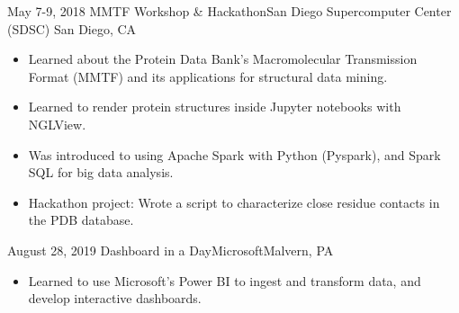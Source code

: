 \begin{experiences}
 \experience
    {May 7-9, 2018} {MMTF Workshop \& Hackathon}{San Diego Supercomputer Center (SDSC)}{ San Diego, CA}
    {}    {
        \begin{itemize}
        \item Learned about the Protein Data Bank's Macromolecular Transmission Format (MMTF) and its applications for structural data mining.
        \item Learned to render protein structures inside Jupyter notebooks with NGLView.
        \item Was introduced to using Apache Spark with Python (Pyspark), and Spark SQL for big data analysis.
        \item Hackathon project: Wrote a script to characterize close residue contacts in the PDB database.
        \end{itemize}
    }

\emptySeparator

\experience
    {August 28, 2019} {Dashboard in a Day}{Microsoft}{Malvern, PA}
    {}    {
        \begin{itemize}
        \item Learned to use Microsoft's Power BI to ingest and transform data, and develop interactive dashboards.
        \end{itemize}
    }
\end{experiences}